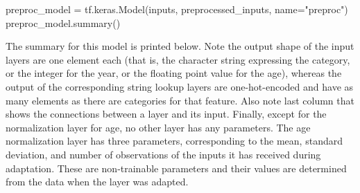 \begin{samepage}
\begin{pythoncode}
preproc_model = tf.keras.Model(inputs, 
                               preprocessed_inputs,
                               name="preproc")
preproc_model.summary()
\end{pythoncode}
\end{samepage}

The summary for this model is printed below. Note the output shape of the input layers are one element each (that is, the character string expressing the category, or the integer for the year, or the floating point value for the age), whereas the output of the corresponding string lookup layers are one-hot-encoded and have as many elements as there are categories for that feature. Also note last column that shows the connections between a layer and its input. Finally, except for the normalization layer for age, no other layer has any parameters. The age normalization layer has three parameters, corresponding to the mean, standard deviation, and number of observations of the inputs it has received during adaptation. These are non-trainable parameters and their values are determined from the data when the layer was adapted. 

